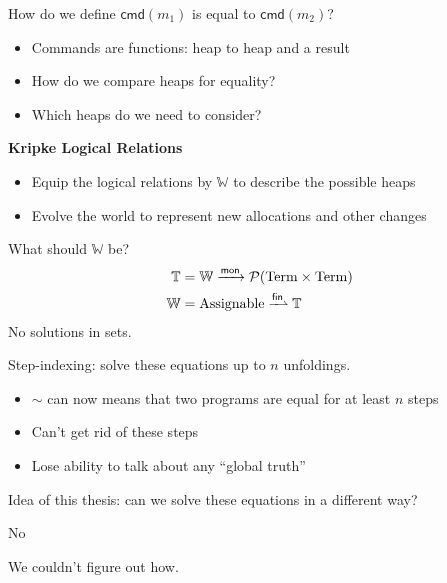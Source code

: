 \documentclass{beamer}
\newcommand{\mto}{\ensuremath{\xrightarrow{\mathsf{mon}}}}
\newcommand{\pto}{\ensuremath{\xrightharpoonup{\mathsf{fin}}}}
\newcommand{\pow}[1]{\ensuremath{\mathcal{P}(#1)}}
\newcommand{\worlds}{\ensuremath{\mathbb{W}}}
\newcommand{\assignables}{\ensuremath{\mathrm{Assignable}}}
\newcommand{\semtypes}{\ensuremath{\mathbb{T}}}
\newcommand{\term}{\ensuremath{\mathrm{Term}}}
\newcommand{\cmd}[1]{\ensuremath{\mathsf{cmd}(#1)}}
\begin{document}
\begin{frame}
  \centering
  How do we define $\cmd{m_1}$ is equal to $\cmd{m_2}$?
  \pause
  \bigskip
  \begin{itemize}
  \item Commands are functions: heap to heap and a result
  \item How do we compare heaps for equality?
  \item Which heaps do we need to consider?
  \end{itemize}
\end{frame}

\begin{frame}
  \centering
  \textbf{Kripke Logical Relations}

  \begin{itemize}
  \item Equip the logical relations by $\worlds$ to describe the
    possible heaps
  \item Evolve the world to represent new allocations and other
    changes
  \end{itemize}
\end{frame}

\begin{frame}
  \centering What should $\worlds$ be?
  \begin{align*}
    \semtypes &= \worlds \mto \pow{\term \times \term}\\
    \worlds &= \assignables \pto \semtypes
  \end{align*}
  \pause
  \bigskip
  No solutions in sets.
\end{frame}

\begin{frame}
  Step-indexing: solve these equations up to $n$ unfoldings.

  \begin{itemize}
  \item $\sim$ can now means that two programs are equal for at least
    $n$ steps
  \item Can't get rid of these steps
  \item Lose ability to talk about any ``global truth''
  \end{itemize}
\end{frame}

\begin{frame}
  \centering
  Idea of this thesis: can we solve these equations in a different
  way?

  \pause
  \bigskip
  No

  \pause
  \bigskip
  We couldn't figure out how.
\end{frame}
\end{document}
